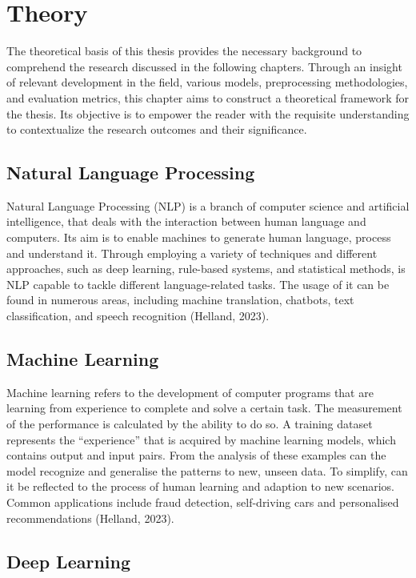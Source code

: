 \chapter{Theory}

The theoretical basis of this thesis provides the necessary background to comprehend the research discussed in the following chapters. Through an insight of relevant development in the field, various models, preprocessing methodologies, and evaluation metrics, this chapter aims to construct a theoretical framework for the thesis. Its objective is to empower the reader with the requisite understanding to contextualize the research outcomes and their significance.

\section{Natural Language Processing}

Natural Language Processing (NLP) is a branch of computer science and artificial intelligence, that deals with the interaction between human language and computers. Its aim is to enable machines to generate human language, process and understand it. Through employing a variety of techniques and different approaches, such as deep learning, rule-based systems, and statistical methods, is NLP capable to tackle different language-related tasks. The usage of it can be found in numerous areas, including machine translation, chatbots, text classification, and speech recognition (Helland, 2023).

\section{Machine Learning}

Machine learning refers to the development of computer programs that are learning from experience to complete and solve a certain task. The measurement of the performance is calculated by the ability to do so. A training dataset represents the “experience” that is acquired by machine learning models, which contains output and input pairs. From the analysis of these examples can the model recognize and generalise the patterns to new, unseen data. To simplify, can it be reflected to the process of human learning and adaption to new scenarios. Common applications include fraud detection, self-driving cars and personalised recommendations (Helland, 2023).

\section{Deep Learning}


